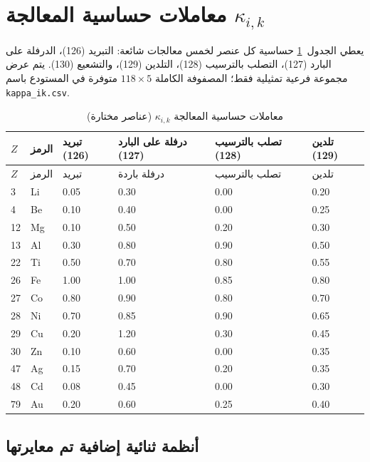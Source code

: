 \documentclass[12pt,a4paper]{article}
\begin{document}
	\section{معاملات حساسية المعالجة \(\kappa_{i,k}\)}
	يعطي الجدول~\ref{tab:kappa_ik} حساسية كل عنصر لخمس معالجات شائعة: التبريد (126)، الدرفلة على البارد (127)، التصلب بالترسيب (128)، التلدين (129)، والتشعيع (130). يتم عرض مجموعة فرعية تمثيلية فقط؛ المصفوفة الكاملة \(118\times5\) متوفرة في المستودع باسم \texttt{kappa\_ik.csv}.
	
	\begin{longtable}{p{1.8cm} p{1.2cm} p{1.2cm} p{1.2cm} p{1.2cm} p{1.2cm}}
		\caption{معاملات حساسية المعالجة \(\kappa_{i,k}\) (عناصر مختارة)}\label{tab:kappa_ik}\\
		\toprule
		\(Z\) & الرمز & تبريد (126) & درفلة على البارد (127) & تصلب بالترسيب (128) & تلدين (129) \\
		\midrule
		\endfirsthead
		\toprule
		\(Z\) & الرمز & تبريد & درفلة باردة & تصلب بالترسيب & تلدين \\
		\midrule
		\endhead
		3  & Li  & 0.05 & 0.30 & 0.00 & 0.20 \\
		4  & Be  & 0.10 & 0.40 & 0.00 & 0.25 \\
		12 & Mg  & 0.10 & 0.50 & 0.20 & 0.30 \\
		13 & Al  & 0.30 & 0.80 & 0.90 & 0.50 \\
		22 & Ti  & 0.50 & 0.70 & 0.80 & 0.55 \\
		26 & Fe  & 1.00 & 1.00 & 0.85 & 0.80 \\
		27 & Co  & 0.80 & 0.90 & 0.80 & 0.70 \\
		28 & Ni  & 0.70 & 0.85 & 0.90 & 0.65 \\
		29 & Cu  & 0.20 & 1.20 & 0.30 & 0.45 \\
		30 & Zn  & 0.10 & 0.60 & 0.00 & 0.35 \\
		47 & Ag  & 0.15 & 0.70 & 0.20 & 0.35 \\
		48 & Cd  & 0.08 & 0.45 & 0.00 & 0.30 \\
		79 & Au  & 0.20 & 0.60 & 0.25 & 0.40 \\
		\bottomrule
	\end{longtable}
	
	
	\subsection*{أنظمة ثنائية إضافية تم معايرتها}
	
\end{document}
